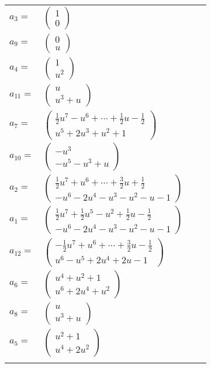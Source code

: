 \documentclass[1p]{elsarticle_modified}
\theoremstyle{definition}
\begin{document}
\begin{tabular}{m{7pt} m{180pt} m{7pt} m{180pt} }
\flushright $a_{3}=$&$\begin{pmatrix}1\\0\end{pmatrix}$ \\
\flushright $a_{9}=$&$\begin{pmatrix}0\\u\end{pmatrix}$ \\
\flushright $a_{4}=$&$\begin{pmatrix}1\\u^2\end{pmatrix}$ \\
\flushright $a_{11}=$&$\begin{pmatrix}u\\u^3+u\end{pmatrix}$ \\
\flushright $a_{7}=$&$\begin{pmatrix}\frac{1}{2} u^7- u^6+\cdots+\frac{1}{2} u-\frac{1}{2}\\u^5+2 u^3+u^2+1\end{pmatrix}$ \\
\flushright $a_{10}=$&$\begin{pmatrix}- u^3\\- u^5- u^3+u\end{pmatrix}$ \\
\flushright $a_{2}=$&$\begin{pmatrix}\frac{1}{2} u^7+u^6+\cdots+\frac{3}{2} u+\frac{1}{2}\\- u^6-2 u^4- u^3- u^2- u-1\end{pmatrix}$ \\
\flushright $a_{1}=$&$\begin{pmatrix}\frac{1}{2} u^7+\frac{1}{2} u^5- u^2+\frac{1}{2} u-\frac{1}{2}\\- u^6-2 u^4- u^3- u^2- u-1\end{pmatrix}$ \\
\flushright $a_{12}=$&$\begin{pmatrix}-\frac{1}{2} u^7+u^6+\cdots+\frac{3}{2} u-\frac{1}{2}\\u^6- u^5+2 u^4+2 u-1\end{pmatrix}$ \\
\flushright $a_{6}=$&$\begin{pmatrix}u^4+u^2+1\\u^6+2 u^4+u^2\end{pmatrix}$ \\
\flushright $a_{8}=$&$\begin{pmatrix}u\\u^3+u\end{pmatrix}$ \\
\flushright $a_{5}=$&$\begin{pmatrix}u^2+1\\u^4+2 u^2\end{pmatrix}$\\&\end{tabular}
\end{document}
